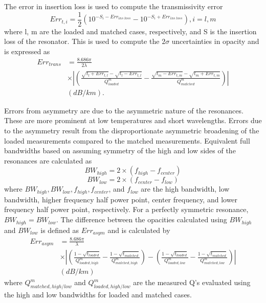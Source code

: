 The error in insertion loss is used to compute the transmissivity error
\begin{equation}
Err_{t,i} = \frac{1}{2} ( 10^{-S_i - Err_{ins\;loss}} - 10^{-S_i + Err_{ins\;loss}}) , i=l,m
\end{equation}
where l, m are the loaded and matched cases, respectively, and S is the insertion loss of the resonator. This is used to compute the $2\sigma$ uncertainties in opacity and is expressed as
\begin{equation}
\begin{split}
Err_{trans} &= \frac{8.686 \pi}{2\lambda}\\ 
 &\times \left| \left( \frac{\sqrt{t_l + Err_{t,l}}- \sqrt{t_l - Err_{t,l}}}{Q^m_{loaded}} - \frac{\sqrt{t_m - Err_{t,m}}- \sqrt{t_m + Err_{t,m}}}{Q^m_{matched}} \right) \right|\\
 &(dB/km).
\end{split}
\end{equation}

Errors from asymmetry are due to the asymmetric nature of the resonances. These are more prominent at low temperatures and short wavelengths. Errors due to the asymmetry result from the disproportionate asymmetric broadening of the loaded measurements compared to the matched measurements. Equivalent full bandwidths based on assuming symmetry of the high and low sides of the resonances are calculated as
\begin{equation}
BW_{high} = 2 \times (f_{high} - f_{center})
\end{equation}
\begin{equation}
BW_{low} = 2 \times (f_{center} - f_{low})
\end{equation}
where $BW_{high}, BW_{low}, f_{high}, f_{center}$, and $f_{low}$ are the high bandwidth, low bandwidth, higher frequency half power point, center frequency, and lower frequency half power point, respectively. For a perfectly symmetric resonance, $BW_{high} = BW_{low}$. The difference between the opacities calculated using $BW_{high}$ and $BW_{low}$ is defined as $Err_{asym}$ and is calculated by
\begin{equation}
\begin{split}
Err_{asym} &= \frac{8.686 \pi}{\lambda} 
\\ &\times \left| \left( \frac{1-\sqrt{t_{loaded}}}{Q^m_{loaded,high}} - \frac{1-\sqrt{t_{matched}}}{Q^m_{matched,high}} \right) - \left( \frac{1-\sqrt{t_{loaded}}}{Q^m_{loaded,low}} - \frac{1-\sqrt{t_{matched}}}{Q^m_{matched,low}} \right) \right|\\
 &(dB/km)
\end{split}
\end{equation}
where $Q^m_{matched,high/low}$ and $Q^m_{loaded,high/low}$ are the measured Q's evaluated using the high and low bandwidths for loaded and matched cases. 

